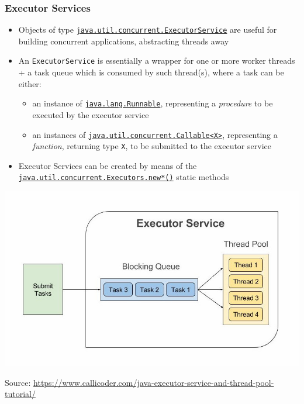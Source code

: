 \documentclass{beamer}\mode<presentation>{\usetheme{AMSCesenaPurpleAndGold}}
\begin{document}
\begin{frame}[allowframebreaks]\frametitle{Executor Services}

	\begin{itemize}
		\item Objects of type \href{https://docs.oracle.com/javase/8/docs/api/java/util/concurrent/ExecutorService.html}{\texttt{java.util.concurrent.\alert{ExecutorService}}} are useful for building \alert{concurrent} applications, abstracting threads away
		
		\bigskip
		
		\item An \alert{\texttt{ExecutorService}} is essentially a wrapper for one or more \alert{worker} threads + a \alert{task queue} which is consumed by such thread(s), where a task can be either:
		\begin{itemize}
			\item an instance of \href{https://docs.oracle.com/javase/8/docs/api/java/lang/Runnable.html}{\texttt{java.lang.\alert{Runnable}}}, representing a \emph{procedure} to be \alert{executed} by the executor service
			
			\item an instances of \href{https://docs.oracle.com/javase/8/docs/api/java/util/concurrent/Callable.html}{\texttt{java.util.concurrent.\alert{Callable<X>}}}, representing a \emph{function}, returning type \texttt{X}, to be \alert{submitted} to the executor service
		\end{itemize}
		
		\bigskip
		
		\item Executor Services can be created by means of the \href{https://docs.oracle.com/javase/8/docs/api/java/util/concurrent/Executors.html}{\texttt{java.util.concurrent.Executor\alert{s}.new*()}} static methods
	\end{itemize}

	\framebreak
	
	\begin{center}
		\includegraphics[width=.9\linewidth]{img/executor_service.jpg}
		
		{\tiny Source: \url{https://www.callicoder.com/java-executor-service-and-thread-pool-tutorial/}}
	\end{center}

	\framebreak
	
	

\end{frame}
\end{document}
